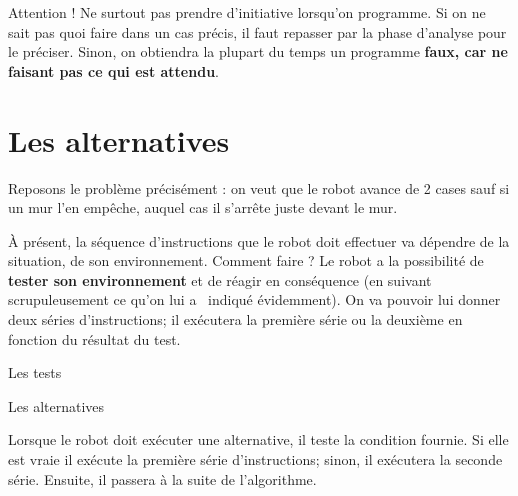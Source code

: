 	Attention ! Ne surtout pas prendre d'initiative
	lorsqu'on programme. Si on ne sait pas quoi faire dans
	un cas précis, il faut repasser par la phase d'analyse
	pour le préciser. Sinon, on obtiendra la plupart du temps un programme
	\textbf{faux, car ne faisant pas ce qui est attendu}.

\section{Les alternatives}

	Reposons le problème précisément : on veut que le robot avance de 2
	cases sauf si un mur l'en empêche, auquel cas il
	s'arrête juste devant le mur.
	
	À présent, la séquence d'instructions que le robot doit
	effectuer va dépendre de la situation, de son environnement. Comment
	faire ? Le robot a la possibilité de \textbf{tester son environnement}
	et de réagir en conséquence (en suivant scrupuleusement ce
	qu'on lui a \ indiqué évidemment). On va pouvoir lui
	donner deux séries d'instructions; il exécutera la
	première série ou la deuxième en fonction du résultat du test.

	\begin{Emphase}{Les tests}
	\end{Emphase}

	\begin{Emphase}{Les alternatives}
	\end{Emphase}

	Lorsque le robot doit exécuter une alternative, il teste la condition
	fournie. Si elle est vraie il exécute la première série
	d'instructions; sinon, il exécutera la seconde série.
	Ensuite, il passera à la suite de l'algorithme.

